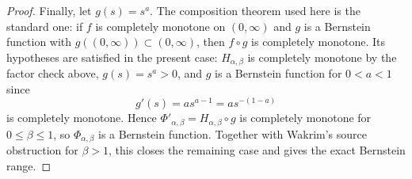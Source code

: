 \begin{proof}
Finally, let \(g(s)=s^a\).  The composition theorem used here is the standard
one: if \(f\) is completely monotone on \((0,\infty)\) and \(g\) is a
Bernstein function with \(g((0,\infty))\subset(0,\infty)\), then \(f\circ g\)
is completely monotone.  Its hypotheses are satisfied in the present case:
\(H_{\alpha,\beta}\) is completely monotone by the factor check above,
\(g(s)=s^a>0\), and \(g\) is a Bernstein function for \(0<a<1\) since
\[
  g'(s)=a s^{a-1}=a s^{-(1-a)}
\]
is completely monotone.  Hence
\(\Phi'_{\alpha,\beta}=H_{\alpha,\beta}\circ g\) is completely monotone for
\(0\le\beta\le1\), so \(\Phi_{\alpha,\beta}\) is a Bernstein function.
Together with Wakrim's source obstruction for \(\beta>1\), this closes the
remaining case and gives the exact Bernstein range.
\end{proof}

